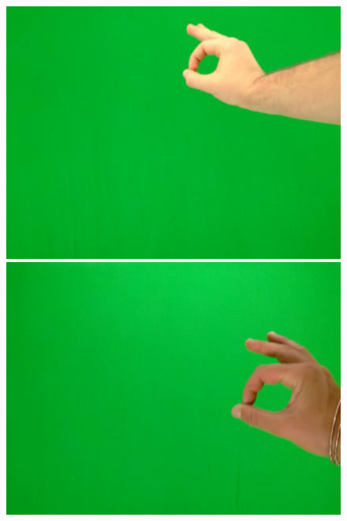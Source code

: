 \begin{figure}[htb]
\begin{minipage}[c]{0.19\linewidth}
   \end{minipage} 
   \begin{minipage}[c]{0.19\linewidth}
      \includegraphics[width=0.95\linewidth]{figures/g2-17.jpg}
   \end{minipage} 
   \begin{minipage}[c]{0.19\linewidth}
      \includegraphics[width=0.95\linewidth]{figures/g2-19.jpg}
   \end{minipage}  \\      
   \vspace{1em}
   \begin{minipage}[c]{0.19\linewidth}

\end{minipage}
\end{figure}

